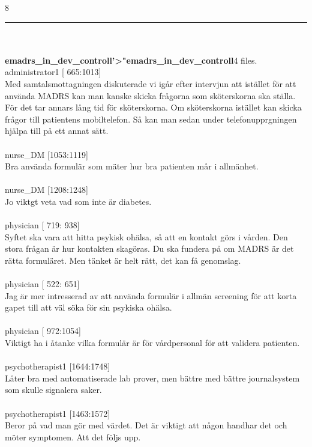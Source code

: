 \documentclass[12pt,a4paper,oneside]{article}
\begin{document}
8 
\hrule
\ \\\ \\{\bf emadrs\_in\_dev\_controll'>"emadrs\_in\_dev\_controll}4 files.
 administrator1 [ 665:1013]\\ 
Med samtalsmottagningen diskuterade vi ig{\aa}r efter intervjun att ist{\"a}llet f{\"o}r att anv{\"a}nda MADRS  kan man kanske skicka fr{\aa}gorna som sk{\"o}terskorna ska st{\"a}lla. F{\"o}r det tar annars l{\aa}ng tid f{\"o}r sk{\"o}terskorna. Om sk{\"o}terskorna ist{\"a}llet kan skicka fr{\aa}gor till patientens mobiltelefon. S{\aa} kan man sedan under telefonupprgningen hj{\"a}lpa till p{\aa} ett annat s{\"a}tt.  %
\ \\\ \\
 nurse\_DM [1053:1119]\\ 
Bra anv{\"a}nda formul{\"a}r som m{\"a}ter hur bra patienten m{\aa}r i allm{\"a}nhet.  %
\ \\\ \\
 nurse\_DM [1208:1248]\\ 
Jo viktgt veta vad som inte {\"a}r diabetes. %
\ \\\ \\
 physician [ 719: 938]\\ 
 Syftet ska vara att hitta psykisk oh{\"a}lsa, s{\aa} att en kontakt g{\"o}rs i v{\aa}rden. Den stora fr{\aa}gan {\"a}r hur kontakten skag{\"o}ras. Du ska fundera p{\aa} om MADRS {\"a}r det r{\"a}tta formul{\"a}ret. Men t{\"a}nket {\"a}r helt r{\"a}tt, det kan f{\aa} genomslag.  %
\ \\\ \\
 physician [ 522: 651]\\ 
Jag {\"a}r mer intresserad av att anv{\"a}nda formul{\"a}r i allm{\"a}n screening f{\"o}r att korta gapet till att v{\"a}l s{\"o}ka f{\"o}r sin psykiska oh{\"a}lsa.  %
\ \\\ \\
 physician [ 972:1054]\\ 
Viktigt ha i {\aa}tanke vilka formul{\"a}r {\"a}r f{\"o}r v{\aa}rdpersonal f{\"o}r att validera patienten. %
\ \\\ \\
 psychotherapist1 [1644:1748]\\ 
L{\aa}ter bra med automatiserade lab prover, men b{\"a}ttre med b{\"a}ttre journalsystem som skulle signalera saker. %
\ \\\ \\
 psychotherapist1 [1463:1572]\\ 
Beror p{\aa} vad man g{\"o}r med v{\"a}rdet. Det {\"a}r viktigt att n{\aa}gon handhar det och m{\"o}ter symptomen. Att det f{\"o}ljs upp. %
\end{document}
